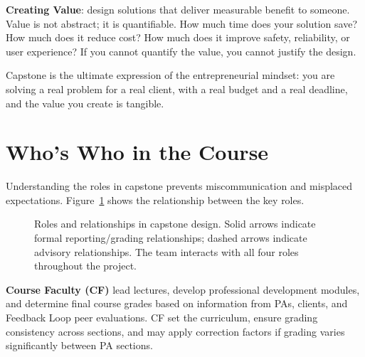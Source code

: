 \textbf{Creating Value}: design solutions that deliver measurable benefit to someone. Value is not abstract; it is quantifiable. How much time does your solution save? How much does it reduce cost? How much does it improve safety, reliability, or user experience? If you cannot quantify the value, you cannot justify the design.

Capstone is the ultimate expression of the entrepreneurial mindset: you are solving a real problem for a real client, with a real budget and a real deadline, and the value you create is tangible.


\section{Who's Who in the Course}
Understanding the roles in capstone prevents miscommunication and misplaced expectations. Figure~\ref{fig:whos-who} shows the relationship between the key roles.

\begin{figure}[htbp]
\centering
{}
\caption{Roles and relationships in capstone design. Solid arrows indicate formal reporting/grading relationships; dashed arrows indicate advisory relationships. The team interacts with all four roles throughout the project.}\label{fig:whos-who}
\end{figure}

\textbf{Course Faculty (CF)} lead lectures, develop professional development modules, and determine final course grades based on information from PAs, clients, and Feedback Loop peer evaluations. CF set the curriculum, ensure grading consistency across sections, and may apply correction factors if grading varies significantly between PA sections.

